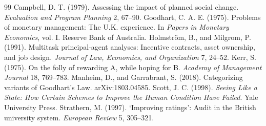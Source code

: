 \documentclass[11pt]{article}
\theoremstyle{remark}
\begin{document}
\begin{thebibliography}{99}\small
{} Campbell, D. T. (1979). Assessing the impact of planned social change. \emph{Evaluation and Program Planning} 2, 67--90.
 Goodhart, C. A. E. (1975). Problems of monetary management: The U.K. experience. In \emph{Papers in Monetary Economics}, vol. I. Reserve Bank of Australia.
 Holmstr\"om, B., and Milgrom, P. (1991). Multitask principal-agent analyses: Incentive contracts, asset ownership, and job design. \emph{Journal of Law, Economics, and Organization} 7, 24--52.
 Kerr, S. (1975). On the folly of rewarding A, while hoping for B. \emph{Academy of Management Journal} 18, 769--783.
 Manheim, D., and Garrabrant, S. (2018). Categorizing variants of Goodhart's Law. arXiv:1803.04585.
 Scott, J. C. (1998). \emph{Seeing Like a State: How Certain Schemes to Improve the Human Condition Have Failed}. Yale University Press.
 Strathern, M. (1997). `Improving ratings': Audit in the British university system. \emph{European Review} 5, 305--321.
\end{thebibliography}
\end{document}
